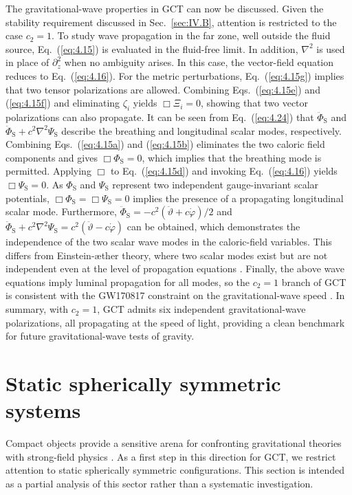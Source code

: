 \documentclass[aps,prd,twocolumn]{revtex4-2}
\newcommand\p{\partial}
\begin{document}
The gravitational-wave properties in GCT can now be discussed. Given the stability requirement discussed in Sec.~\ref{sec:IV.B}, attention is restricted to the case $c_2=1$. To study wave propagation in the far zone, well outside the fluid source, Eq.~(\ref{eq:4.15}) is evaluated in the fluid-free limit. In addition, $\nabla^2$ is used in place of $\p_z^2$ when no ambiguity arises. In this case, the vector-field equation reduces to Eq.~(\ref{eq:4.16}). For the metric perturbations, Eq.~(\ref{eq:4.15g}) implies that two tensor polarizations are allowed. Combining Eqs.~(\ref{eq:4.15e}) and (\ref{eq:4.15f}) and eliminating $\zeta_i$ yields $\Box\Xi_i=0$, showing that two vector polarizations can also propagate. It can be seen from Eq.~(\ref{eq:4.24}) that $\ddot{\Phi}_\mathrm{S}$ and $\ddot{\Phi}_\mathrm{S} + c^2\nabla^2\Psi_\mathrm{S}$ describe the breathing and longitudinal scalar modes, respectively. Combining Eqs.~(\ref{eq:4.15a}) and (\ref{eq:4.15b}) eliminates the two caloric field components and gives $\Box\Phi_\mathrm{S}=0$, which implies that the breathing mode is permitted. Applying $\Box$ to Eq.~(\ref{eq:4.15d}) and invoking Eq.~(\ref{eq:4.16}) yields $\Box\Psi_\mathrm{S}=0$. As $\Phi_\mathrm{S}$ and $\Psi_\mathrm{S}$ represent two independent gauge-invariant scalar potentials, $\Box\Phi_\mathrm{S}=\Box\Psi_\mathrm{S}=0$ implies the presence of a propagating longitudinal scalar mode. Furthermore, $\ddot{\Phi}_\mathrm{S} = -c^2(\ddot{\vartheta}+c\dot{\varphi})/2$ and $\ddot{\Phi}_\mathrm{S} + c^2\nabla^2\Psi_\mathrm{S} = c^2(\ddot{\vartheta}-c\dot{\varphi})$ can be obtained, which demonstrates the independence of the two scalar wave modes in the caloric-field variables. This differs from Einstein-{\ae}ther theory, where two scalar modes exist but are not independent even at the level of propagation equations \cite{Gong2018.PRD.97.084040,Zhang2020.PRD.101.044002}. Finally, the above wave equations imply luminal propagation for all modes, so the $c_2=1$ branch of GCT is consistent with the GW170817 constraint on the gravitational-wave speed \cite{Abbott2017.PRL.119.161101,Abbott2017.ApJL.848.L13}. In summary, with $c_2=1$, GCT admits six independent gravitational-wave polarizations, all propagating at the speed of light, providing a clean benchmark for future gravitational-wave tests of gravity.


\section{Static spherically symmetric systems}\label{sec:V}
Compact objects provide a sensitive arena for confronting gravitational theories with strong-field physics \cite{Yagi2016.CQG.33.054001,Olmo2020.PhysRep.876.1}. As a first step in this direction for GCT, we restrict attention to static spherically symmetric configurations. This section is intended as a partial analysis of this sector rather than a systematic investigation.
\end{document}

